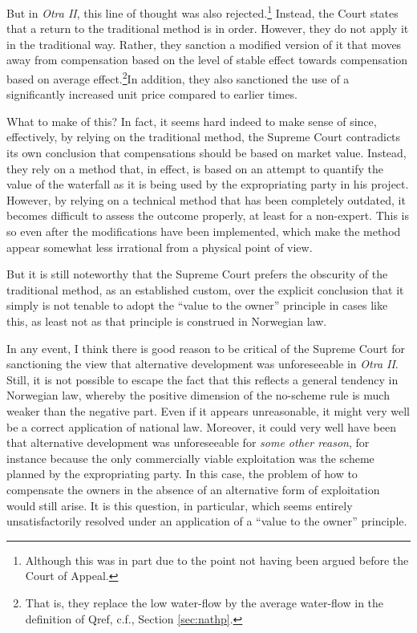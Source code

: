 But in \emph{Otra II}, this line of thought was also rejected.\footnote{Although this was in part due to the point not having been argued before the Court of Appeal.} Instead, the Court states that a return to the traditional method is in order. However, they do not apply it in the traditional way. Rather, they sanction a modified version of it that moves away from compensation based on the level of stable effect towards compensation based on average effect.\footnote{That is, they replace the low water-flow by the average water-flow in the definition of Qref, c.f., Section \ref{sec:nathp}.}In addition, they also sanctioned the use of a significantly increased unit price compared to earlier times.

What to make of this? In fact, it seems hard indeed to make sense of since, effectively, by relying on the traditional method, the Supreme Court contradicts its own conclusion that compensations should be based on market value. Instead, they rely on a method that, in effect, is based on an attempt to quantify the value of the waterfall as it is being used by the expropriating party in his project. However, by relying on a technical method that has been completely outdated, it becomes difficult to assess the outcome properly, at least for a non-expert. This is so even after the modifications have been implemented, which make the method appear somewhat less irrational from a physical point of view.

But it is still noteworthy that the Supreme Court prefers the obscurity of the traditional method, as an established custom, over the explicit conclusion that it simply is not tenable to adopt the ``value to the owner'' principle in cases like this, as least not as that principle is construed in Norwegian law.

In any event, I think there is good reason to be critical of the Supreme Court for sanctioning the view that alternative development was unforeseeable in {\it Otra II}. Still, it is not possible to escape the fact that this reflects a general tendency in Norwegian law, whereby the positive dimension of the no-scheme rule is much weaker than the negative part. Even if it appears unreasonable, it might very well be a correct application of national law. Moreover, it could very well have been that alternative development was unforeseeable for \emph{some other reason}, for instance because the only commercially viable exploitation was the scheme planned by the expropriating party. In this case, the problem of how to compensate the owners in the absence of an alternative form of exploitation would still arise. It is this question, in particular, which seems entirely unsatisfactorily resolved under an application of a ``value to the owner'' principle.

